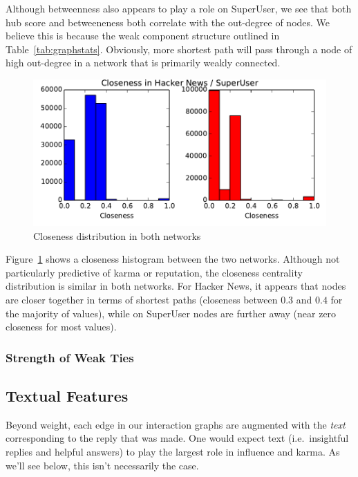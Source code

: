 \documentclass[11pt]{article}
\begin{document}
Although betweenness also appears to play a role on SuperUser, we see that
both hub score and betweeneness both correlate with the out-degree of nodes.
We believe this is because the weak component structure outlined in 
Table~\ref{tab:graphstats}. Obviously, more shortest path will pass through a
node of high out-degree in a network that is primarily weakly connected.

\begin{figure}[h]
\centering
\includegraphics[width=\linewidth]{closeness}
\caption{Closeness distribution in both networks}
\label{fig:closeness}
\end{figure}

Figure~\ref{fig:closeness} shows a closeness histogram between the two networks.
Although not particularly predictive of karma or reputation, the closeness
centrality distribution is similar in both networks. For Hacker News, it appears
that nodes are closer together in terms of shortest paths (closeness between
$0.3$ and $0.4$ for the majority of values), while on SuperUser nodes are
further away (near zero closeness for most values).


\subsubsection{Strength of Weak Ties}


\subsection{Textual Features}
Beyond weight, each edge in our interaction graphs are augmented with the
\textit{text} corresponding to the reply that was made. One would expect 
text (i.e.\ insightful replies and helpful answers) to play the largest role 
in influence and karma. As we'll see below, this isn't necessarily the case.
\end{document}
